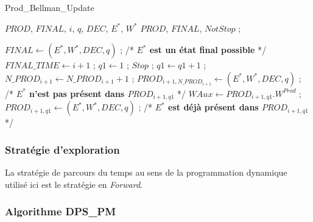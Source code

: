 \begin{algorithm} 
	\caption{Prod\_Bellman\_Update}
	\label{Prod-Bellman-Update}
	\begin{algorithmic}[1]
		\REQUIRE $PROD$, $FINAL$, $i$, $q$, $DEC$, $E^*$, $W^*$ 
		\ENSURE $PROD$, $FINAL$,
		\hline
		\vspace{0.5cm}
		\INITIALISATION
		\STATE $NotStop$ ;
		\vspace{0.3cm}
		
		\BOUCLEPRINCIPAL
		\vspace{0.2cm}
		\STATE $FINAL \leftarrow (E^*, W^*,DEC, q )$ ; /* \textbf{$E^*$ est un état final possible} */
		\STATE $FINAL\_TIME \leftarrow i+1$ ;
		\ENDIF
		\ELSE
		\STATE $q1 \leftarrow 1$ ;
		\STATE $Stop$ ; 
		\ELSE
		\STATE $q1 \leftarrow q1 +1$ ;
		\ENDIF
		\ENDWHILE
		\STATE $N\_PROD_{i+1} \leftarrow N\_PROD_{i+1} +1$ ;
		\STATE $PROD_{i+1, N\_PROD_{i+1}} \leftarrow (E^*, W^*,DEC, q )$ ; /* \textbf{$E^*$ n'est pas présent dans $PROD_{i+1,q1}$ } */
		\ELSE
		\STATE $WAux \leftarrow PROD_{i+1,q1}.W^{Prod} $ ;
		\STATE $PROD_{i+1, q1} \leftarrow (E^*, W^*, DEC, q)$ ; /* \textbf{$E^*$ est déjà présent dans $PROD_{i+1,q1}$ } */
		\ENDIF 
		\ENDIF
		\ENDIF
	\end{algorithmic}
\end{algorithm}
\subsubsection{Stratégie d'exploration }
La stratégie de parcours du temps au sens de la programmation dynamique utilisé ici est le stratégie en \textit{Forward}.
\subsubsection{Algorithme DPS\_PM}

